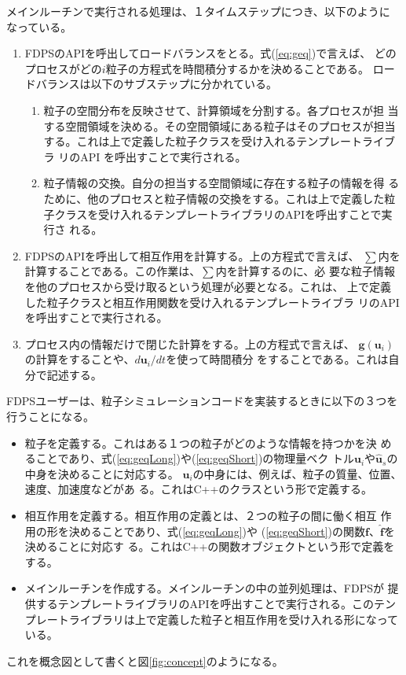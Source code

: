 \documentclass[12pt,a4paper]{jarticle}
\begin{document}
メインルーチンで実行される処理は、１タイムステップにつき、以下のように
なっている。
\begin{enumerate}
\item FDPSのAPIを呼出してロードバランスをとる。式(\ref{eq:geq})で言えば、
  どのプロセスがどの$i$粒子の方程式を時間積分するかを決めることである。
  ロードバランスは以下のサブステップに分かれている。
  \label{proc:loadbalancing}
  \begin{enumerate}
  \item 粒子の空間分布を反映させて、計算領域を分割する。各プロセスが担
    当する空間領域を決める。その空間領域にある粒子はそのプロセスが担当
    する。これは上で定義した粒子クラスを受け入れるテンプレートライブラ
    リのAPI を呼出すことで実行される。
    \label{proc:decomposeDomain}
  \item 粒子情報の交換。自分の担当する空間領域に存在する粒子の情報を得
    るために、他のプロセスと粒子情報の交換をする。これは上で定義した粒
    子クラスを受け入れるテンプレートライブラリのAPIを呼出すことで実行さ
    れる。
    \label{proc:exchangeParticle}
  \end{enumerate}
\item FDPSのAPIを呼出して相互作用を計算する。上の方程式で言えば、
  $\sum$内を計算することである。この作業は、$\sum$内を計算するのに、必
  要な粒子情報を他のプロセスから受け取るという処理が必要となる。これは、
  上で定義した粒子クラスと相互作用関数を受け入れるテンプレートライブラ
  リのAPIを呼出すことで実行される。
  \label{proc:calcInteraction}
\item プロセス内の情報だけで閉じた計算をする。上の方程式で言えば、
  $\bm{g}(\bm{u}_i)$の計算をすることや、$d\bm{u}_i/dt$を使って時間積分
  をすることである。これは自分で記述する。 \label{proc:local}
\end{enumerate}

FDPSユーザーは、粒子シミュレーションコードを実装するときに以下の３つを
行うことになる。
\begin{itemize}
\item 粒子を定義する。これはある１つの粒子がどのような情報を持つかを決
  めることであり、式(\ref{eq:geqLong})や(\ref{eq:geqShort})の物理量ベク
  トル$\bm{u}_i$や$\bm{\hat{u}}_s$の中身を決めることに対応する。
  $\bm{u}_i$の中身には、例えば、粒子の質量、位置、速度、加速度などがあ
  る。これはC++のクラスという形で定義する。
\item 相互作用を定義する。相互作用の定義とは、２つの粒子の間に働く相互
  作用の形を決めることであり、式(\ref{eq:geqLong})や
  (\ref{eq:geqShort})の関数$\bm{f}$、$\bm{\hat{f}}$を決めることに対応す
  る。これはC++の関数オブジェクトという形で定義をする。
\item メインルーチンを作成する。メインルーチンの中の並列処理は、FDPSが
  提供するテンプレートライブラリのAPIを呼出すことで実行される。このテン
  プレートライブラリは上で定義した粒子と相互作用を受け入れる形になって
  いる。
\end{itemize}
これを概念図として書くと図\ref{fig:concept}のようになる。
\end{document}
